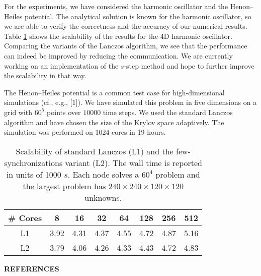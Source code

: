 \documentclass{report}
\begin{document}
For the experiments, we have considered the harmonic oscillator and the
Henon--Heiles potential. The analytical solution is known for the
harmonic oscillator, so we are able to verify the correctness and the
accuracy of our numerical results. Table \ref{tab:1} shows the
scalability of the results for the 4D harmonic oscillator. Comparing the
variants of the Lanczos algorithm, we see that the performance can indeed
be improved by reducing the communication. We are currently working on an
implementation of the $s$-step method and hope to further improve the
scalability in that way.

The Henon--Heiles potential is a common test case for high-dimensional
simulations (cf., e.g., [1]). We have simulated this problem in five
dimensions on a grid with $60^5$ points over $10000$ time steps. We used
the standard Lanczos algorithm and have chosen the size of the Krylov
space adaptively. The simulation was performed on 1024 cores in 19 hours.

\begin{table}[htdp]
\caption{Scalability of standard Lanczos (L1) and the
few-synchronizations variant (L2). The wall time is reported in units of
1000 $s$. Each node solves a $60^{4}$ problem and the largest problem has
$240 \times 240 \times 120 \times 120$ unknowns.}
\begin{center}
\begin{tabular}{|c|c|c|c|c|c|c|c|}
\hline
\# Cores & 8 & 16 & 32 & 64 & 128 & 256 & 512 \\
\hline
L1& 3.92& 4.31& 4.37& 4.55& 4.72& 4.87& 5.16 \\
L2& 3.79& 4.06& 4.26& 4.33& 4.43& 4.72& 4.83 \\
\hline
\end{tabular}
\end{center}
\label{tab:1}
\end{table}%


\begin{center}
{\bf REFERENCES}\\[-3mm]
\end{center}
\end{document}
